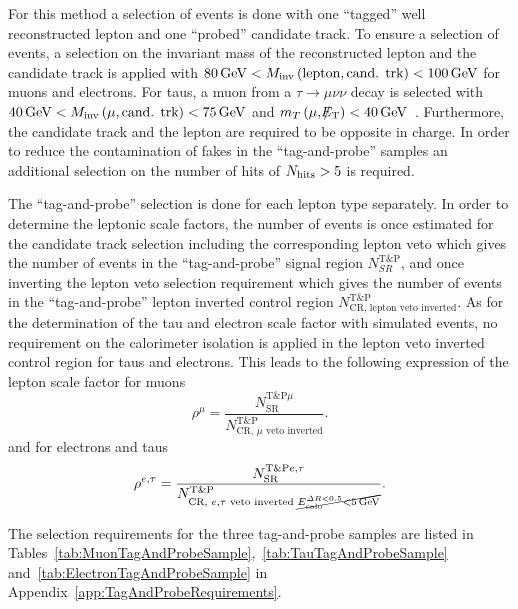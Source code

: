 For this method a selection of \Zlep events is done with one ``tagged'' well reconstructed lepton and one ``probed'' candidate track.
To ensure a selection of \Zlep events, a selection on the invariant mass of  the reconstructed lepton and the candidate track is applied with $80\,\text{Ge}\kern-0.06667em\text{V}<M_{\text{inv}}\left( \text{lepton}, \text{cand. trk}  \right)<100\,\text{Ge}\kern-0.06667em\text{V}$ for muons and electrons.
For taus, a muon from a $\tau\rightarrow\mu\nu\nu$ decay is selected with $40\,\text{Ge}\kern-0.06667em\text{V}<M_{\text{inv}}\left( \mu, \text{cand. trk}  \right)<75\,\text{Ge}\kern-0.06667em\text{V}$ and $m_T\left(\mu,\slash\mkern-12mu{E}_{\text{T}}\right)<40\,\text{Ge}\kern-0.06667em\text{V}$~\cite{bib:CMS:DT_Thesis,bib:CMS:DT_8TeV_AN}.
Furthermore, the candidate track and the lepton are required to be opposite in charge.
In order to reduce the contamination of fakes in the ``tag-and-probe'' samples an additional selection on the number of hits of $N_{\text{hits}}>5$ is required.

The ``tag-and-probe'' selection is done for each lepton type separately.
In order to determine the leptonic scale factors, the number of events is once estimated for the candidate track selection including the corresponding lepton veto which gives the number of events in the ``tag-and-probe'' signal region $N_{SR}^{\text{T\&P}}$, and once inverting the lepton veto selection requirement which gives the number of events in the ``tag-and-probe'' lepton inverted control region $N_{\text{CR, lepton veto inverted}}^{\text{T\&P}}$.
As for the determination of the tau and electron scale factor with simulated \WJets events, no requirement on the calorimeter isolation is applied in the lepton veto inverted control region for taus and electrons.
This leads to the following expression of the lepton scale factor for muons
\begin{equation}
\label{eq:ScaleFactorSys_Mu}
\rho^{\mu} = \frac{N_{\text{SR}}^{\text{T\&P}\mu}}{N_{\text{CR, }\mu\text{ veto inverted}}^{\text{T\&P}}}.
\end{equation}
and for electrons and taus 
\begin{equation}
\label{eq:ScaleFactorSys_Tau}
\rho^{e,\tau} = \frac{N_{\text{SR}}^{\text{T\&P}e,\tau}}{N_{\text{CR, }e,\tau \text{ veto inverted } \cancel{E^{\Delta R<0.5}_{\text{calo}}<5\,\text{Ge}\kern-0.06667em\text{V}}}^{\text{T\&P}}}.
\end{equation}

The selection requirements for the three tag-and-probe samples are listed in Tables~\ref{tab:MuonTagAndProbeSample},~\ref{tab:TauTagAndProbeSample} and~\ref{tab:ElectronTagAndProbeSample} in Appendix~\ref{app:TagAndProbeRequirements}.

